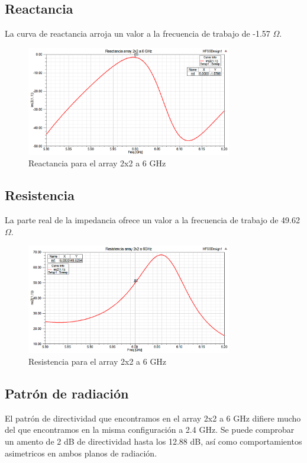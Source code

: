 \newpage
\subsection{Reactancia}
\par La curva de reactancia arroja un valor a la frecuencia de trabajo de -1.57 $\Omega$. 
\\
\begin{figure}[H]
    \centering
        \includegraphics[width=0.8\textwidth]{archivos/analisis/2x22/2}
        \caption{Reactancia para el array 2x2 a 6 GHz}
        \label{fig:react2x22}
\end{figure}

\subsection{Resistencia}
\par La parte real de la impedancia ofrece un valor a la frecuencia de trabajo de 49.62 $\Omega$.
\\
\begin{figure}[H]
    \centering
        \includegraphics[width=0.8\textwidth]{archivos/analisis/2x22/3}
        \caption{Resistencia para el array 2x2 a 6 GHz}
        \label{fig:resis2x22}
\end{figure}

\subsection{Patrón de radiación}
\par El patrón de directividad que encontramos en el array 2x2 a 6 GHz difiere mucho del que encontramos en la misma configuración a 2.4 GHz. Se puede comprobar un amento de 2 dB de directividad hasta los 12.88 dB, así como comportamientos asimetricos en ambos planos de radiación. 
\\
